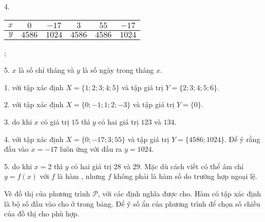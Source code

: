 4.
\begin{tabular}{|c|c|c|c|c|c|}
   \hline
   $x$ & $0$ & $-17$ & $3$ & $55$ & $-17$ \\
   \hline
   $y$ & $4586$ & $1024$ & $4586$ & $4586$ & $1024$ \\
   \hline
\end{tabular};

5. $x$ là số chỉ tháng và $y$ là số ngày trong tháng $x$.

\solution

1.  với tập xác định $X = \boxed{\{1; 2; 3; 4; 5\}}$ và tập giá trị $Y = \boxed{\{2; 3; 4; 5; 6\}}$.

2.  với tập xác định $X = \boxed{\{0; -1; 1; 2; -3\}}$ và tập giá trị $Y = \boxed{\{0\}}$.

3.  do khi $x$ có giá trị $15$ thì $y$ có hai giá trị $123$ và $134$.

4.  với tập xác định $X = \boxed{\{0; -17; 3; 55\}}$ và tập giá trị $Y = \boxed{\{4586; 1024\}}$. Để ý rằng đầu vào $x=-17$ luôn ứng với đầu ra $y = 1024$.

5.  do khi $x = 2$ thì $y$ có hai giá trị $28$ và $29$. Mặc dù cách viết có thể ám chỉ $y=f(x)$ với $f$ là hàm , nhưng $f$ không phải là hàm số do  trường hợp ngoại lệ.

\exercise[intropt] Vẽ đồ thị của phương trình $\mathcal{P}$, với các định nghĩa được cho. Hàm có tập xác định là bộ số đầu vào cho ở trong bảng. Để ý số ẩn của phương trình để chọn số chiều của đồ thị cho phù hợp.

